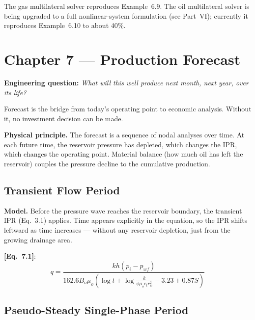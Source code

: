 \documentclass[11pt,a4paper,openany]{book}
\newcommand{\eqrefbook}[1]{\textcolor{blue!60!black}{\textbf{[Eq.~#1]}}}
\begin{document}
\begin{warnbox}
The gas multilateral solver reproduces Example~6.9. The oil
multilateral solver is being upgraded to a full nonlinear-system
formulation (see Part~VI); currently it reproduces Example~6.10 to
about 40\%.
\end{warnbox}

\chapter{Chapter 7 — Production Forecast}

\begin{purpose}
\textbf{Engineering question:} \emph{What will this well produce next
month, next year, over its life?}

Forecast is the bridge from today's operating point to economic
analysis. Without it, no investment decision can be made.
\end{purpose}

\begin{theory}
\textbf{Physical principle.} The forecast is a sequence of nodal
analyses over time. At each future time, the reservoir pressure has
depleted, which changes the IPR, which changes the operating point.
Material balance (how much oil has left the reservoir) couples the
pressure decline to the cumulative production.
\end{theory}

\section{Transient Flow Period}

\begin{theory}
\textbf{Model.} Before the pressure wave reaches the reservoir
boundary, the transient IPR (Eq.~3.1) applies. Time appears explicitly
in the equation, so the IPR shifts leftward as time increases —
without any reservoir depletion, just from the growing drainage area.
\end{theory}

\eqrefbook{7.1}:
\begin{equation}
  q = \frac{kh(p_i - p_{wf})}{162.6 B_o\mu_o\left(
    \log t + \log\frac{k}{\phi\mu_o c_t r_w^2} - 3.23 + 0.87S
  \right)}
\end{equation}

\section{Pseudo-Steady Single-Phase Period}
\end{document}
